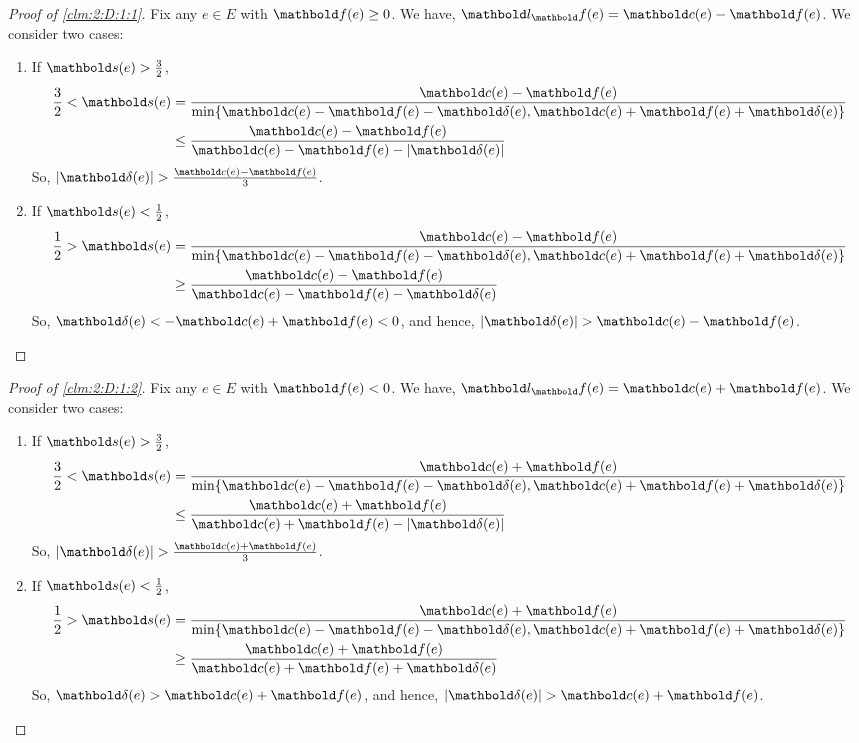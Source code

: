 \documentclass{tufte-handout}
\begin{document}
\begin{proof}[Proof of \cref{clm:2:D:1:1}]
Fix any $e \in E$ with $\vf(e) \geq 0$. We have, $\vl_\vf(e) = \vc(e) - \vf(e)$. We consider two cases: \begin{enumerate}
    \item If $\vs(e) > \frac{3}{2}$, \begin{align*}
        \frac{3}{2} < \vs(e) &= \frac{\vc(e) - \vf(e)}{\min\{\vc(e) - \vf(e) - \vdelta(e), \vc(e) + \vf(e) + \vdelta(e)\}} \\
        &\leq \frac{\vc(e) - \vf(e)}{\vc(e) - \vf(e) - |\vdelta(e)|}
    \end{align*} So, $|\vdelta(e)| > \frac{\vc(e) - \vf(e)}{3}$.
    \item If $\vs(e) < \frac{1}{2}$, \begin{align*}
        \frac{1}{2} > \vs(e) &= \frac{\vc(e) - \vf(e)}{\min\{\vc(e) - \vf(e) - \vdelta(e), \vc(e) + \vf(e) + \vdelta(e)\}} \\
        &\geq \frac{\vc(e) - \vf(e)}{\vc(e) - \vf(e) - \vdelta(e)}
    \end{align*} So, $\vdelta(e) < -\vc(e) + \vf(e) < 0$, and hence, $|\vdelta(e)| > \vc(e) - \vf(e)$. \qedhere
\end{enumerate}
\end{proof}

\begin{proof}[Proof of \cref{clm:2:D:1:2}]
Fix any $e \in E$ with $\vf(e) < 0$. We have, $\vl_\vf(e) = \vc(e) + \vf(e)$. We consider two cases: \begin{enumerate}
    \item If $\vs(e) > \frac{3}{2}$, \begin{align*}
        \frac{3}{2} < \vs(e) &= \frac{\vc(e) + \vf(e)}{\min\{\vc(e) - \vf(e) - \vdelta(e), \vc(e) + \vf(e) + \vdelta(e)\}} \\
        &\leq \frac{\vc(e) + \vf(e)}{\vc(e) + \vf(e) - |\vdelta(e)|}
    \end{align*} So, $|\vdelta(e)| > \frac{\vc(e) + \vf(e)}{3}$.
    \item If $\vs(e) < \frac{1}{2}$, \begin{align*}
        \frac{1}{2} > \vs(e) &= \frac{\vc(e) + \vf(e)}{\min\{\vc(e) - \vf(e) - \vdelta(e), \vc(e) + \vf(e) + \vdelta(e)\}} \\
        &\geq \frac{\vc(e) + \vf(e)}{\vc(e) + \vf(e) + \vdelta(e)}
    \end{align*} So, $\vdelta(e) > \vc(e) + \vf(e)$, and hence, $|\vdelta(e)| > \vc(e) + \vf(e)$. \qedhere
\end{enumerate}
\end{proof}
\end{document}
